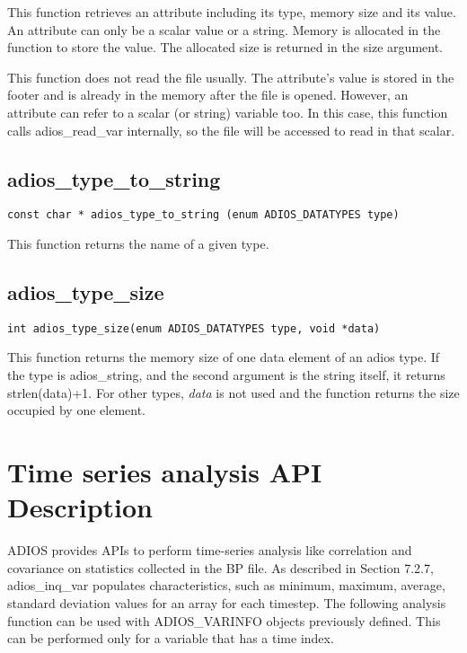 This function retrieves an attribute including its type, memory size and its value. 
An attribute can only be a scalar value or a string. Memory is allocated in the 
function to store the value. The allocated size is returned in the size argument. 

This function does not read the file usually. The attribute's value is stored in 
the footer and is already in the memory after the file is opened. However, an attribute 
can refer to a scalar (or string) variable too. In this case, this function calls 
adios\_read\_var internally, so the file will be accessed to read in that scalar. 
\label{HToc182553409}

\subsection{adios\_type\_to\_string}

\begin{lstlisting}[]
const char * adios_type_to_string (enum ADIOS_DATATYPES type)
\end{lstlisting}

This function returns the name of a given type.\label{HToc182553410}

\subsection{adios\_type\_size}

\begin{lstlisting}[]
int adios_type_size(enum ADIOS_DATATYPES type, void *data)
\end{lstlisting}

This function returns the memory size of one data element of an adios type. If 
the type is adios\_string, and the second argument is the string itself, it returns 
strlen(data)+1. For other types, \textit{data} is not used and the function returns 
the size occupied by one element.\label{HToc182553411}

\section{Time series analysis API Description}

ADIOS provides APIs to perform time-series analysis like correlation and covariance 
on statistics collected in the BP file. As described in Section 7.2.7, adios\_inq\_var 
populates characteristics, such as minimum, maximum, average, standard deviation 
values for an array for each timestep. The following analysis function can be used 
with ADIOS\_VARINFO objects previously defined. This can be performed only for 
a variable that has a time index.\label{HToc182553412}

